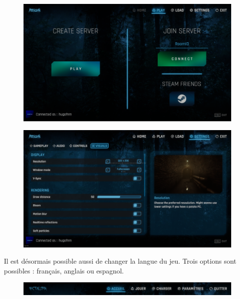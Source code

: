 \begin{figure}[H]
\centering
\begin{minipage}{.5\textwidth}
  \centering
  \includegraphics[width=.9\linewidth]{img/ui/UI.png}
  \label{fig:uiplay}
\end{minipage}%
\begin{minipage}{.5\textwidth}
  \centering
  \includegraphics[width=.9\linewidth]{img/ui/UI4.png}
  \label{fig:uisettings}
\end{minipage}
\end{figure}

Il est désormais possible aussi de changer la langue du jeu. Trois options sont possibles : français, anglais ou espagnol.

\begin{figure}[H]
\centering
\begin{minipage}{.5\textwidth}
  \centering
  \centerline{\includegraphics[width=2\linewidth]{img/uwufolder/fr.png}}
  \label{fig:fr}
\end{minipage}%
\end{figure}

